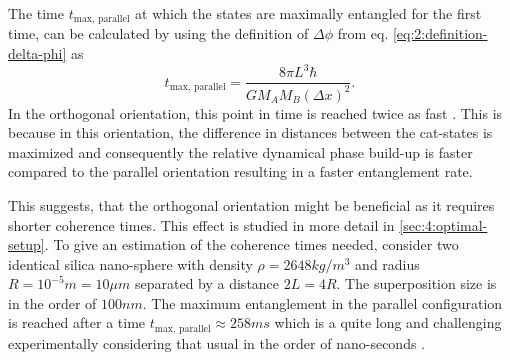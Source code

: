 The time $t_\mathrm{max,\,parallel}$ at which the states are maximally entangled for the first time, can be calculated by using the definition of $\Delta\phi$ from eq. \eqref{eq:2:definition-delta-phi} as
\begin{equation}\label{eq:2:t-max-parallel}
  t_\mathrm{max,\,parallel} = \frac{8 \pi L^3\hbar}{G M_A M_B (\Delta x)^2} .
\end{equation}
In the orthogonal orientation, this point in time is reached twice as fast \cite{Pedernales_2023}. This is because in this orientation, the difference in distances between the cat-states is maximized and consequently the relative dynamical phase build-up is faster compared to the parallel orientation resulting in a faster entanglement rate.

This suggests, that the orthogonal orientation might be beneficial as it requires shorter coherence times. This effect is studied in more detail in \cref{sec:4:optimal-setup}.
To give an estimation of the coherence times needed, consider two identical silica nano-sphere with density $\rho=2648\si{kg/m^3}$ and radius $R=10^{-5}\si{m}=10\si{\mu m}$ separated by a distance $2L = 4R$.
The superposition size is in the order of $100\si{nm}$.
The maximum entanglement in the parallel configuration is reached after a time $t_\mathrm{max,\,parallel} \approx 258\si{ms}$ which is a quite long and challenging experimentally considering that usual in the order of nano-seconds \cite{OConnell_2010}.
